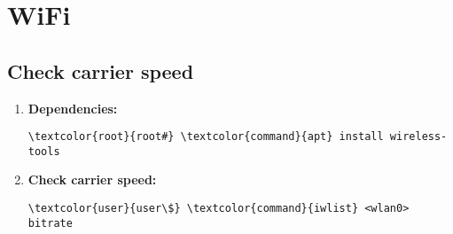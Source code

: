 \documentclass[10pt, a4paper, onecolumn, openany]{book} %
\begin{document}
\section{WiFi}
\subsection{Check carrier speed}
\begin{enumerate}
    \item \textbf{Dependencies:}
\begin{Verbatim}[commandchars=\\\{\}]
\textcolor{root}{root#} \textcolor{command}{apt} install wireless-tools
\end{Verbatim}
    \item \textbf{Check carrier speed:}
\begin{Verbatim}[commandchars=\\\{\}]
\textcolor{user}{user\$} \textcolor{command}{iwlist} <wlan0> bitrate
\end{Verbatim}
\end{enumerate}
\end{document}
